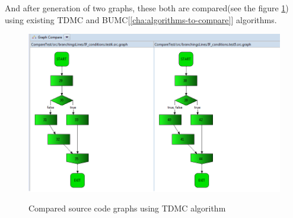 \documentclass{report}
\begin{document}
And after generation of two graphs, these both are compared(see the figure \ref{fig:graphs-compared}) using existing TDMC and BUMC[\ref{cha:algorithms-to-compare}] algorithms.
\begin{figure}
  \centering
  \includegraphics[width=1.00\textwidth]{Figures/Java-flowchart-exp/graphs-compared.png}\\[0.1cm]
  \caption[Compared source code graphs using TDMC algorithm \ref{sec:topdown} ]{Compared source code graphs using TDMC algorithm}
  \label{fig:graphs-compared}
\end{figure}
\end{document}
